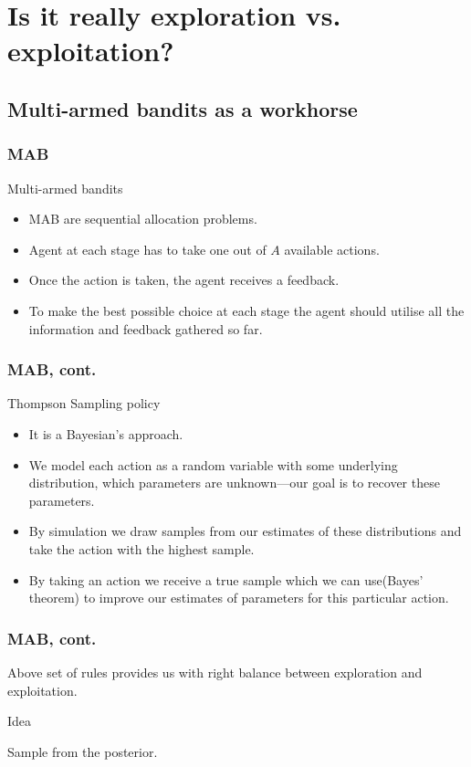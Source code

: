 \documentclass{beamer}
\begin{document}
\section{Is it really exploration vs. exploitation?} 
\subsection{Multi-armed bandits as a workhorse}
  \begin{frame}
  \frametitle{MAB}
  \begin{block}{Multi-armed bandits}
    \begin{itemize}
      \item MAB are sequential allocation problems.
      \item Agent at each stage has to take one out of $A$ available actions.
      \item Once the action is taken, the agent receives a feedback.
      \item To make the best possible choice at each stage the agent should utilise all the information and feedback gathered so far.
    \end{itemize}
  \end{block}
  \end{frame}
  \begin{frame}
  \frametitle{MAB, cont.}
  \begin{block}{Thompson Sampling policy}
    \begin{itemize}
      \item It is a Bayesian's approach.
      \item We model each action as a random variable with some underlying distribution, which parameters are unknown---our goal is to recover these parameters.
      \item By simulation we draw samples from our estimates of these distributions and take the action with the highest sample.
      \item By taking an action we receive a true sample which we can use(Bayes' theorem) to improve our estimates of parameters for this particular action.
    \end{itemize}
  \end{block}
  \end{frame}
  \begin{frame}
  \frametitle{MAB, cont.}
  Above set of rules provides us with right balance between exploration and exploitation.
  \begin{block}{Idea}
    \begin{center}
      Sample from the posterior.
    \end{center}
  \end{block}
  \end{frame}
\end{document}
